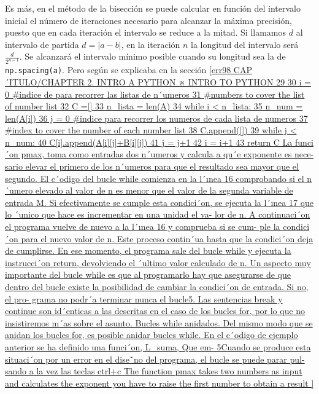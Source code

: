 \begin{paracol}{2}
Es más, en el método de la bisección se puede calcular en función del intervalo inicial el número de iteraciones necesario para alcanzar la máxima precisión, puesto que en cada iteración el intervalo se reduce a la mitad. Si llamamos $d$ al intervalo de partida $d=\vert a-b \vert$, en la iteración $n$ la longitud del intervalo será $\frac{d}{2^{n-1}}$. Se alcanzará el intervalo mínimo posible cuando su longitud sea la de \texttt{np.spacing(a)}. Pero según se explicaba en la sección \ref{err98 CAP´ITULO/CHAPTER 2. INTRO A PYTHON ※ INTRO TO PYTHON
29
30 i = 0 #indice de para recorrer las listas de n´umeros
31 #numbers to cover the list of number list
32 C =[]
33 n_lista = len(A)
34 while i < n_lista:
35 n_num = len(A[i])
36 j = 0 #indice para recorrer los numeros de cada lista de numeros
37 #index to cover the number of each number list
38 C.append([])
39 while j < n_num:
40 C[i].append(A[i][j]+B[i][j])
41 j = j+1
42 i = i+1
43 return C
La funci´on pmax, toma como entradas dos
n´umeros y calcula a qu´e exponente es nece-
sario elevar el primero de los n´umeros para
que el resultado sea mayor que el segundo. El
c´odigo del bucle while comienza en la l´ınea 16
comprobando si el n´umero elevado al valor de
n es menor que el valor de la segunda variable
de entrada M. Si efectivamente se cumple esta
condici´on, se ejecuta la l´ınea 17 que lo ´unico
que hace es incrementar en una unidad el va-
lor de n. A continuaci´on el programa vuelve
de nuevo a la l´ınea 16 y comprueba si se cum-
ple la condici´on para el nuevo valor de n. Este
proceso contin´ua hasta que la condici´on deja
de cumplirse. En ese momento, el programa
sale del bucle while y ejecuta la instrucci´on
return, devolviendo el ´ultimo valor calculado
de n.
Un aspecto muy importante del bucle while
es que al programarlo hay que asegurarse de
que dentro del bucle existe la posibilidad de
cambiar la condici´on de entrada. Si no, el pro-
grama no podr´a terminar nunca el bucle5. Las
sentencias break y continue son id´enticas a
las descritas en el caso de los bucles for, por
lo que no insistiremos m´as sobre el asunto.
Bucles while anidados. Del mismo modo
que se anidan los bucles for, es posible anidar
bucles while. En el c´odigo de ejemplo anterior
se ha definido una funci´on, L_suma, Que em-
5Cuando se produce esta situaci´on por un error en
el dise˜no del programa, el bucle se puede parar pul-
sando a la vez las teclas ctrl+c
The function pmax takes two numbers as
input and calculates the exponent you have
to raise the first number to obtain a result
}
\end{paracol}
